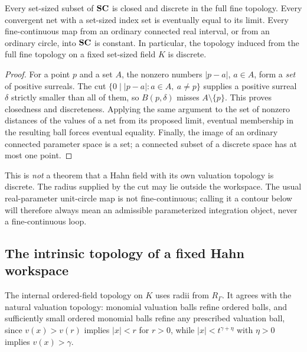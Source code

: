 \documentclass[11pt,letterpaper]{article}
\theoremstyle{definition}
\theoremstyle{remark}
\numberwithin{equation}{section}
\begin{document}
\begin{proposition}\label{contours:prop:fullfine}
Every set-sized subset of $\mathbf{SC}$ is closed and discrete in the full fine topology.
Every convergent net with a set-sized index set is eventually equal to its limit.
Every fine-continuous map from an ordinary connected real interval, or from an
ordinary circle, into $\mathbf{SC}$ is constant. In particular, the topology induced from
the full fine topology on a fixed set-sized field $K$ is discrete.
\end{proposition}
\begin{proof}
For a point $p$ and a set $A$, the nonzero numbers $|p-a|$, $a\in A$, form a
\emph{set} of positive surreals. The cut $\{0\mid |p-a| : a\in A,\ a\ne p\}$
supplies a positive surreal $\delta$ strictly smaller than all of them, so
$B(p,\delta)$ misses $A\setminus\{p\}$. This proves closedness and discreteness.
Applying the same argument to the set of nonzero distances of the values of a net
from its proposed limit, eventual membership in the resulting ball forces eventual
equality. Finally, the image of an ordinary connected parameter space is a set; a
connected subset of a discrete space has at most one point.
\end{proof}

This is \emph{not} a theorem that a Hahn field with its own valuation topology is
discrete. The radius supplied by the cut may lie outside the workspace. The usual
real-parameter unit-circle map is not fine-continuous; calling it a contour below
will therefore always mean an admissible parameterized integration object, never a
fine-continuous loop.

\subsection{The intrinsic topology of a fixed Hahn workspace}
The internal ordered-field topology on $K$ uses radii from $R_\Gamma$. It agrees
with the natural valuation topology: monomial valuation balls refine ordered balls,
and sufficiently small ordered monomial balls refine any prescribed valuation ball,
since $v(x)>v(r)$ implies $|x|<r$ for $r>0$, while $|x|<t^{\gamma+\eta}$ with
$\eta>0$ implies $v(x)>\gamma$.
\end{document}
